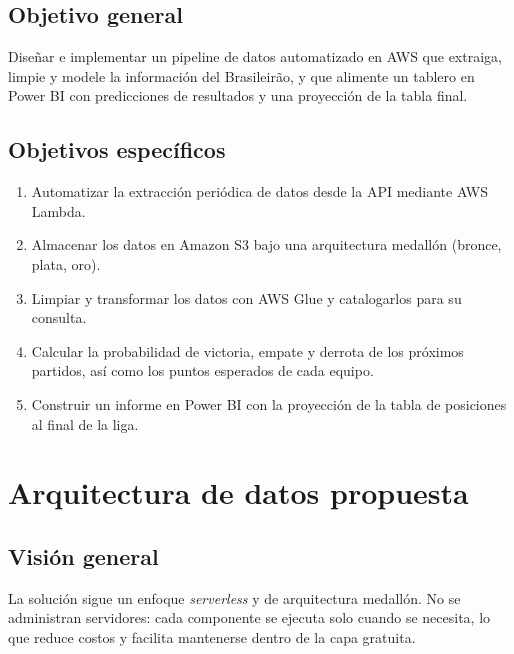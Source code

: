\documentclass[11pt,a4paper]{article}
\begin{document}
\subsection{Objetivo general}
Diseñar e implementar un pipeline de datos automatizado en AWS que extraiga, limpie y modele la información del Brasileirão, y que alimente un tablero en Power BI con predicciones de resultados y una proyección de la tabla final.

\subsection{Objetivos específicos}
\begin{enumerate}
  \item Automatizar la extracción periódica de datos desde la API mediante AWS Lambda.
  \item Almacenar los datos en Amazon S3 bajo una arquitectura medallón (bronce, plata, oro).
  \item Limpiar y transformar los datos con AWS Glue y catalogarlos para su consulta.
  \item Calcular la probabilidad de victoria, empate y derrota de los próximos partidos, así como los puntos esperados de cada equipo.
  \item Construir un informe en Power BI con la proyección de la tabla de posiciones al final de la liga.
\end{enumerate}

\section{Arquitectura de datos propuesta}

\subsection{Visión general}
La solución sigue un enfoque \textit{serverless} y de arquitectura medallón. No se administran servidores: cada componente se ejecuta solo cuando se necesita, lo que reduce costos y facilita mantenerse dentro de la capa gratuita.
\end{document}

